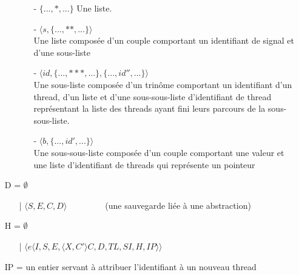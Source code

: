 \documentclass[10pt,a4paper]{article}
\begin{document}
\begin{itemize}
\begin{itemize}
\begin{itemize}
							\item[] - $\{...,*,...\}$ Une liste. 
							\item[] - $\langle s,\{...,**,...\}\rangle$\\
							Une liste composée d'un couple comportant un identifiant de signal et d'une sous-liste
							\item[] - $\langle id,\{...,***,...\},\{...,id'',...\}\rangle$\\
							Une sous-liste composée d'un trinôme comportant un identifiant d'un thread, d'un liste et d'une sous-sous-liste d'identifiant de thread représentant la liste des threads ayant fini leurs parcours de la sous-sous-liste.
							\item[] - $\langle b,\{...,id',...\}\rangle$\\
							Une sous-sous-liste composée d'un couple comportant une valeur et une liste d'identifiant de threads qui représente un pointeur
						\end{itemize}
					\end{itemize}
					\item[] D = $\emptyset$
					\begin{itemize}
						\item[|] $\langle S,E,C,D\rangle$~~~~~~~~~(une sauvegarde liée à une abstraction)
					\end{itemize}
					\item[] H = $\emptyset$ 
					\begin{itemize}
						\item[|] $\langle e\langle I,S,E,\langle X,C' \rangle C,D,TL,SI,H,IP\rangle\rangle$
					\end{itemize} 
					\item[] IP = un entier servant à attribuer l'identifiant à un nouveau thread 
				\end{itemize}
					
				\newpage
		
		
					
\end{document}

